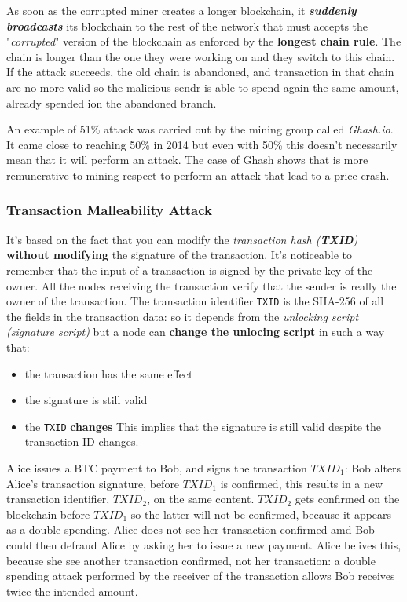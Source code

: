 \documentclass[10pt,a4paper]{report}
\begin{document}
As soon as the corrupted miner creates a longer blockchain, it \textit{\textbf{suddenly broadcasts}} its blockchain to the rest of the network that must accepts the "\textit{corrupted}" version of the blockchain as enforced by the \textbf{longest chain rule}. The chain is longer than the one they were working on and they switch to this chain.
If the attack succeeds,  the old chain is abandoned, and transaction in that chain are no more valid so the malicious sendr is able to spend again the same amount, already spended ion the abandoned branch.

An example of 51\% attack was carried out by the mining group called \textit{Ghash.io}. It came close to reaching 50\% in 2014 but even with 50\% this doesn't necessarily mean that it will perform an attack. The case of Ghash shows that is more remunerative to mining respect to perform an attack that lead to a price crash.
\subsubsection{Transaction Malleability Attack}\label{sec:transaction-malleability-attack}
It's based on the fact that you can modify the \textit{transaction hash (\textbf{TXID})} \textbf{without modifying} the signature of the transaction. It's noticeable to remember that the input of a transaction is signed by the private key of the owner. All the nodes receiving the transaction verify that the sender is really the owner of the transaction.
The transaction identifier \texttt{TXID} is the SHA-256 of all the fields in the transaction data: so it depends from the \textit{unlocking script (signature script)} but a node can \textbf{change the unlocing script} in such a way that:
\begin{itemize}
	\item 
	the transaction has the same effect
	\item 
	the signature is still valid
	\item 
	the \texttt{TXID} \textbf{changes}
	This implies that the signature is still valid despite the transaction ID changes.
\end{itemize}

Alice issues a BTC payment to Bob, and signs the transaction $TXID_{1}$: Bob alters Alice's transaction signature, before $TXID_{1}$ is confirmed, this results in a new transaction identifier, $TXID_{2}$, on the same content.
$TXID_{2}$ gets confirmed on the blockchain before $TXID_{1}$ so the latter will not be confirmed, because it appears as a double spending. Alice does not see her transaction confirmed amd Bob could then defraud Alice by asking her to issue a new payment.
Alice belives this, because she see another transaction confirmed, not her transaction: a double spending attack performed by the receiver of the transaction allows Bob receives twice the intended amount.
\end{document}
